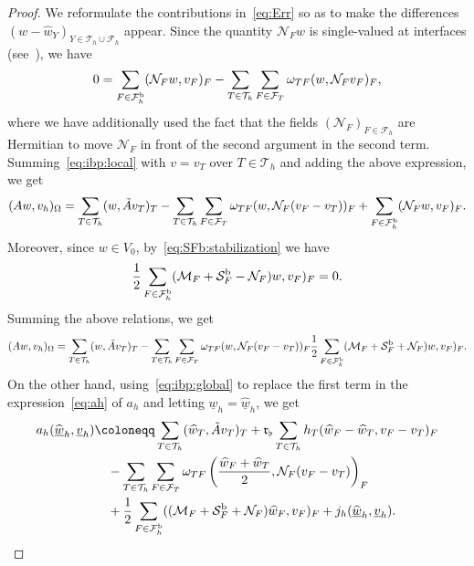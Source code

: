 \documentclass[11pt,a4paper]{article}
\theoremstyle{plain}
\theoremstyle{remark}
\theoremstyle{definition}
\newcommand{\Th}{\mathcal{T}_h}
\newcommand{\Fh}{\mathcal{F}_h}
\newcommand{\Fhb}{\mathcal{F}_h^{\rm b}}
\newcommand{\FT}{\mathcal{F}_T}
\newcommand{\huline}[1]{\widehat{\underline{#1}}}
\newcommand{\Kmin}{\mathfrak{r}_\flat}
\begin{document}
\begin{proof}
  We reformulate the contributions in~\eqref{eq:Err} so as to make the differences $(w - \widehat{w}_Y)_{Y \in \Th \cup \Fh}$ appear.
  Since the quantity $\mathcal{N}_F w$ is single-valued at interfaces (see~\cite[Corollary 60.2]{Ern.Guermond:21*2}), we have
  \[
  0 = \sum_{F \in \Fhb} (\mathcal{N}_F w, v_F)_F
  - \sum_{T \in \Th} \sum_{F \in \FT} \omega_{TF} (w, \mathcal{N}_F v_F)_F,
  \]
  where we have additionally used the fact that the fields $(\mathcal{N}_F)_{F \in \Fh}$ are Hermitian to move $\mathcal{N}_F$ in front of the second argument in the second term.
  Summing~\eqref{eq:ibp:local} with $v = v_T$ over $T \in \Th$ and adding the above expression, we get
  \[
  (A w, v_h)_\Omega
  = \sum_{T \in \Th} (w, \tilde{A} v_T)_T
  - \sum_{T \in \Th} \sum_{F \in \FT} \omega_{TF} (w, \mathcal{N}_F(v_F - v_T))_F
  + \sum_{F \in \Fhb} (\mathcal{N}_F w, v_F)_F.
  \]
  Moreover, since $w \in V_0$, by~\eqref{eq:SFb:stabilization} we have
  \[
  \frac12 \sum_{F \in \Fhb} (\mathcal{M}_F + \mathcal{S}_F^{\rm b} - \mathcal{N}_F) w, v_F)_F = 0.
  \]
  Summing the above relations, we get
  \begin{equation}\label{eq:Eh:reformulation:T1}
    (A w, v_h)_\Omega
    = \sum_{T \in \Th} (w, \tilde{A} v_T)_T
    - \sum_{T \in \Th} \sum_{F \in \FT} \omega_{TF} (w, \mathcal{N}_F(v_F - v_T))_F
    \frac12 \sum_{F \in \Fhb} (\mathcal{M}_F + \mathcal{S}_F^{\rm b} + \mathcal{N}_F) w, v_F)_F.
  \end{equation}
  On the other hand, using~\eqref{eq:ibp:global} to replace the first term in the expression~\eqref{eq:ah} of $a_h$ and letting $\underline{w}_h = \huline{w}_h$, we get
  \begin{equation}\label{eq:Eh:reformulation:T2}
    \begin{aligned}
      a_h(\huline{w}_h, \underline{v}_h)
      &\coloneqq
      \sum_{T \in \Th} (\widehat{w}_T, \tilde{A} v_T)_T
      + \Kmin \sum_{T \in \Th} h_T (\widehat{w}_F - \widehat{w}_T, v_F - v_T)_F
      \\
      &\quad
      - \sum_{T \in \Th} \sum_{F \in \FT} \omega_{TF} \left(
      \frac{\widehat{w}_F + \widehat{w}_T}{2}, \mathcal{N}_F (v_F - v_T)
      \right)_F
      \\
      &\quad
      + \frac12 \sum_{F \in \Fhb} ((\mathcal{M}_F + \mathcal{S}_F^{\rm b} + \mathcal{N}_F) \widehat{w}_F, v_F)_F
      + j_h(\huline{w}_h, \underline{v}_h).
    \end{aligned}
  \end{equation}

\end{proof}
\end{document}
